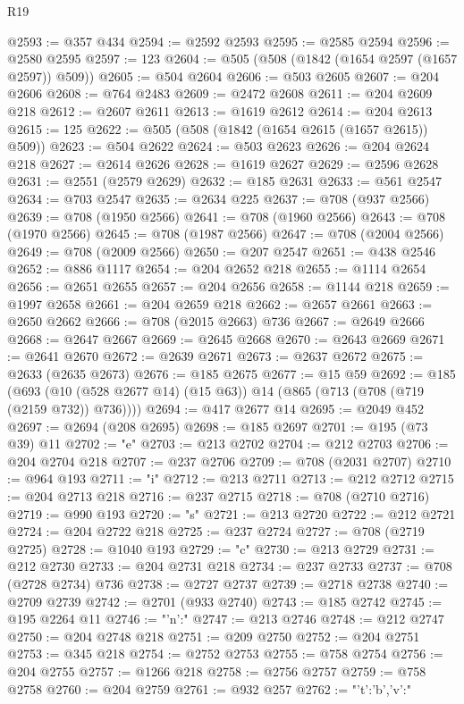 \begin{lexlean}{R19}
\begin{coremodule}
{{{{{@2593 := @357 @434
@2594 := @2592 @2593
@2595 := @2585 @2594
@2596 := @2580 @2595
@2597 := 123
@2604 := @505 (@508 (@1842 (@1654 @2597 (@1657 @2597)) @509))
@2605 := @504 @2604
@2606 := @503 @2605
@2607 := @204 @2606
@2608 := @764 @2483
@2609 := @2472 @2608
@2611 := @204 @2609 @218
@2612 := @2607 @2611
@2613 := @1619 @2612
@2614 := @204 @2613
@2615 := 125
@2622 := @505 (@508 (@1842 (@1654 @2615 (@1657 @2615)) @509))
@2623 := @504 @2622
@2624 := @503 @2623
@2626 := @204 @2624 @218
@2627 := @2614 @2626
@2628 := @1619 @2627
@2629 := @2596 @2628
@2631 := @2551 (@2579 @2629)
@2632 := @185 @2631
@2633 := @561 @2547
@2634 := @703 @2547
@2635 := @2634 @225
@2637 := @708 (@937 @2566)
@2639 := @708 (@1950 @2566)
@2641 := @708 (@1960 @2566)
@2643 := @708 (@1970 @2566)
@2645 := @708 (@1987 @2566)
@2647 := @708 (@2004 @2566)
@2649 := @708 (@2009 @2566)
@2650 := @207 @2547
@2651 := @438 @2546
@2652 := @886 @1117
@2654 := @204 @2652 @218
@2655 := @1114 @2654
@2656 := @2651 @2655
@2657 := @204 @2656
@2658 := @1144 @218
@2659 := @1997 @2658
@2661 := @204 @2659 @218
@2662 := @2657 @2661
@2663 := @2650 @2662
@2666 := @708 (@2015 @2663) @736
@2667 := @2649 @2666
@2668 := @2647 @2667
@2669 := @2645 @2668
@2670 := @2643 @2669
@2671 := @2641 @2670
@2672 := @2639 @2671
@2673 := @2637 @2672
@2675 := @2633 (@2635 @2673)
@2676 := @185 @2675
@2677 := @15 @59
@2692 := @185
    (@693 (@10 (@528 @2677 @14) (@15 @63)) @14 (@865 (@713 (@708 (@719 (@2159 @732)) @736))))
@2694 := @417 @2677 @14
@2695 := @2049 @452
@2697 := @2694 (@208 @2695)
@2698 := @185 @2697
@2701 := @195 (@73 @39) @11
@2702 := "e"
@2703 := @213 @2702
@2704 := @212 @2703
@2706 := @204 @2704 @218
@2707 := @237 @2706
@2709 := @708 (@2031 @2707)
@2710 := @964 @193
@2711 := "i"
@2712 := @213 @2711
@2713 := @212 @2712
@2715 := @204 @2713 @218
@2716 := @237 @2715
@2718 := @708 (@2710 @2716)
@2719 := @990 @193
@2720 := "s"
@2721 := @213 @2720
@2722 := @212 @2721
@2724 := @204 @2722 @218
@2725 := @237 @2724
@2727 := @708 (@2719 @2725)
@2728 := @1040 @193
@2729 := "c"
@2730 := @213 @2729
@2731 := @212 @2730
@2733 := @204 @2731 @218
@2734 := @237 @2733
@2737 := @708 (@2728 @2734) @736
@2738 := @2727 @2737
@2739 := @2718 @2738
@2740 := @2709 @2739
@2742 := @2701 (@933 @2740)
@2743 := @185 @2742
@2745 := @195 @2264 @11
@2746 := "{'n':"
@2747 := @213 @2746
@2748 := @212 @2747
@2750 := @204 @2748 @218
@2751 := @209 @2750
@2752 := @204 @2751
@2753 := @345 @218
@2754 := @2752 @2753
@2755 := @758 @2754
@2756 := @204 @2755
@2757 := @1266 @218
@2758 := @2756 @2757
@2759 := @758 @2758
@2760 := @204 @2759
@2761 := @932 @257
@2762 := "{'t':'b','v':"
}}}}}}}
\end{coremodule}
\end{lexlean}
